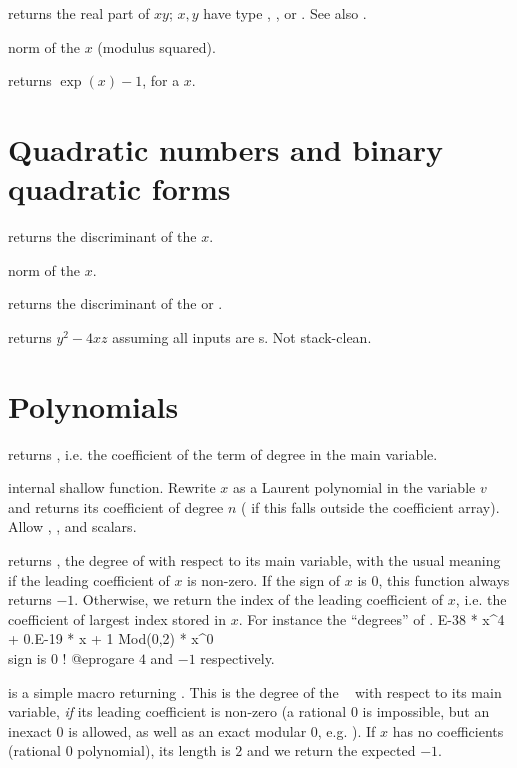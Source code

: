  returns the real part of $xy$;
$x,y$ have type , ,  or . See also
.

 norm of the  $x$ (modulus squared).

 returns $\exp(x)-1$, for a  $x$.

\section{Quadratic numbers and binary quadratic forms}

 returns the discriminant of the  $x$.

 norm of the  $x$.

 returns the discriminant of the 
or  .

 returns $y^2 - 4xz$ assuming all
inputs are s. Not stack-clean.

\section{Polynomials}\label{se:polynomials}

 returns , i.e.
the coefficient of the term of degree  in the main variable.

 internal shallow function. Rewrite
$x$ as a Laurent polynomial in the variable $v$ and returns its coefficient
of degree $n$ ( if this falls outside the coefficient array).
Allow , ,  and scalars.

 returns , the degree of
 with respect to its main variable, with the usual meaning if the
leading coefficient of $x$ is non-zero. If the sign of $x$ is $0$, this
function always returns $-1$. Otherwise, we return the index of the leading
coefficient of $x$, i.e. the coefficient of largest index stored in $x$.
For instance the ``degrees'' of
. E-38 * x^4 + 0.E-19 * x + 1
  Mod(0,2) * x^0    \\ sign is 0 !
@eprog\noindent are $4$ and $-1$ respectively.

 is a simple macro returning .
This is the degree of the ~ with respect to its main
variable, \emph{if} its leading coefficient is non-zero (a rational $0$ is
impossible, but an inexact $0$ is allowed, as well as an exact modular $0$,
e.g. ). If $x$ has no coefficients (rational $0$ polynomial),
its length is $2$ and we return the expected $-1$.

